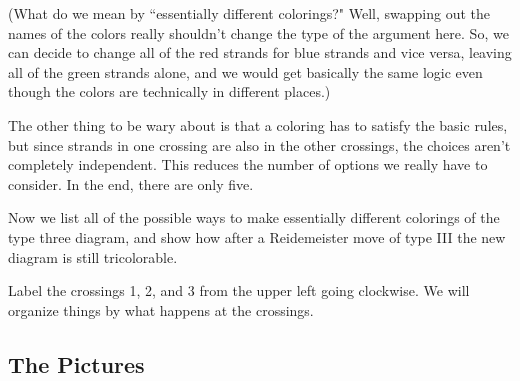 \documentclass[12pt,letterpaper]{article}
\theoremstyle{definition}
\begin{document}
(What do we mean by ``essentially different colorings?" Well, swapping out the names of the colors really shouldn't change the type of the argument here. So, we can decide to change all of the red strands for blue strands and vice versa, leaving all of the green strands alone, and we would get basically the same logic even though the colors are technically in different places.)

The other thing to be wary about is that a coloring has to satisfy the basic rules, but since strands in one crossing are also in the other crossings, the choices aren't completely independent. This reduces the number of options we really have to consider.
In the end, there are only five.

Now we list all of the possible ways to make essentially different colorings of the type three diagram, and show how after a Reidemeister move of type III the new diagram is still tricolorable.

Label the crossings 1, 2, and 3 from the upper left going clockwise.
We will organize things by what happens at the crossings.

\clearpage

\subsection*{The Pictures}
\end{document}
